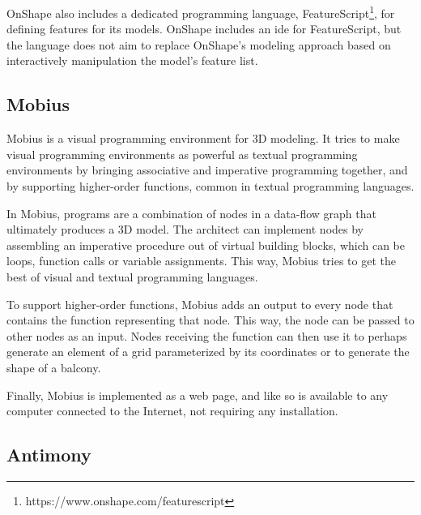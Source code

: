OnShape also includes a dedicated programming language, FeatureScript\footnote{https://www.onshape.com/featurescript}, for defining features for its models.
OnShape includes an \gls{ide} for FeatureScript, but the language does not aim to replace OnShape's modeling approach based on interactively manipulation the model's feature list.


\subsection{Mobius}

Mobius is a visual programming environment for 3D modeling.
It tries to make visual programming environments as powerful as textual programming environments by bringing associative and imperative programming together, and by supporting higher-order functions, common in textual programming languages\cite{Janssen2016}.

In Mobius, programs are a combination of nodes in a data-flow graph that ultimately produces a 3D model.
The architect can implement nodes by assembling an imperative procedure out of virtual building blocks, which can be loops, function calls or variable assignments.
This way, Mobius tries to get the best of visual and textual programming languages.

To support higher-order functions, Mobius adds an output to every node that contains the function representing that node.
This way, the node can be passed to other nodes as an input.
Nodes receiving the function can then use it to perhaps generate an element of a grid parameterized by its coordinates or to generate the shape of a balcony.

Finally, Mobius is implemented as a web page, and like so is available to any computer connected to the Internet, not requiring any installation.




\subsection{Antimony}

